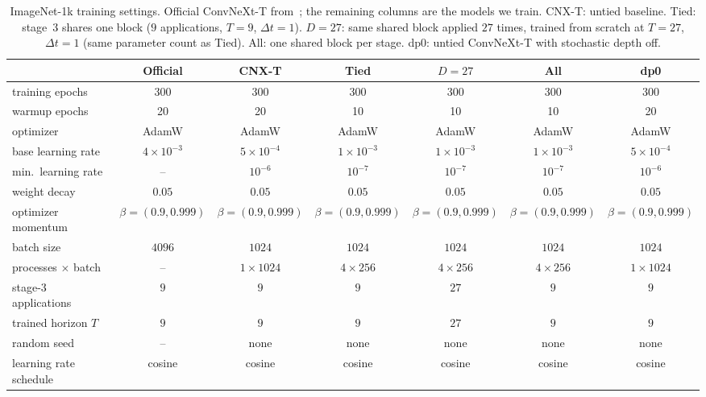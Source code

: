 \begin{table}[t]
    \centering
    \caption{ImageNet-1k training settings.
    Official ConvNeXt-T from~\citet{liu2022convnext}; the remaining columns are the
    models we train.
    CNX-T: untied baseline.
    Tied: stage~3 shares one block ($9$ applications, $T{=}9$, $\Delta t{=}1$).
    $D{=}27$: same shared block applied $27$ times, trained from scratch at $T{=}27$,
    $\Delta t{=}1$ (same parameter count as Tied).
    All: one shared block per stage.
    dp0: untied ConvNeXt-T with stochastic depth off.}
    \label{tab:app-training}
    \small
    \setlength{\tabcolsep}{2.6pt}
    \begin{tabular}{lcccccc}
        \toprule
        & Official & CNX-T & Tied & $D{=}27$ & All & dp0 \\
        \midrule
        training epochs            & 300 & 300 & 300 & 300 & 300 & 300 \\
        warmup epochs              & 20 & 20 & 10 & 10 & 10 & 20 \\
        optimizer                  & AdamW & AdamW & AdamW & AdamW & AdamW & AdamW \\
        base learning rate         & $4{\times}10^{-3}$ & $5{\times}10^{-4}$ & $1{\times}10^{-3}$ & $1{\times}10^{-3}$ & $1{\times}10^{-3}$ & $5{\times}10^{-4}$ \\
        min.\ learning rate        & -- & $10^{-6}$ & $10^{-7}$ & $10^{-7}$ & $10^{-7}$ & $10^{-6}$ \\
        weight decay               & $0.05$ & $0.05$ & $0.05$ & $0.05$ & $0.05$ & $0.05$ \\
        optimizer momentum         & $\beta{=}(0.9,0.999)$ & $\beta{=}(0.9,0.999)$ & $\beta{=}(0.9,0.999)$ & $\beta{=}(0.9,0.999)$ & $\beta{=}(0.9,0.999)$ & $\beta{=}(0.9,0.999)$ \\
        batch size                 & $4096$ & $1024$ & $1024$ & $1024$ & $1024$ & $1024$ \\
        processes $\times$ batch   & -- & $1{\times}1024$ & $4{\times}256$ & $4{\times}256$ & $4{\times}256$ & $1{\times}1024$ \\
        stage-3 applications       & $9$ & $9$ & $9$ & $27$ & $9$ & $9$ \\
        trained horizon $T$        & $9$ & $9$ & $9$ & $27$ & $9$ & $9$ \\
        random seed                & -- & none & none & none & none & none \\
        learning rate schedule     & cosine & cosine & cosine & cosine & cosine & cosine \\

\end{tabular}
\end{table}
